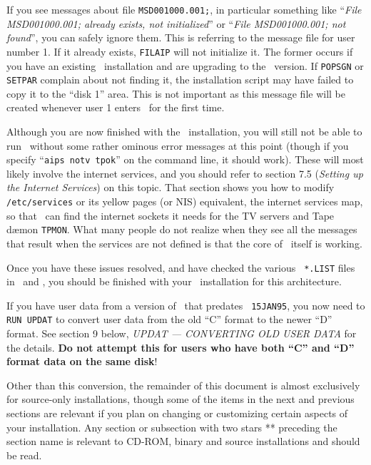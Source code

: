 \medskip{}

If you see messages about file {\tt MSD001000.001;}, in particular
something like ``{\it File MSD001000.001; already exists, not
initialized\/}'' or ``{\it File MSD001000.001; not found\/}'', you can
safely ignore them.  This is referring to the message file for user
number 1.  If it already exists, {\tt FILAIP} will not initialize it.
The former occurs if you have an existing \AIPS\ installation and are
upgrading to the \THISVER\ version.  If {\tt POPSGN} or {\tt SETPAR}
complain about not finding it, the installation script may have failed
to copy it to the ``disk 1'' area.  This is not important as this
message file will be created whenever user 1 enters \ttaips\ for the
first time.

Although you are now finished with the \AIPS\ installation, you will
still not be able to run \ttaips\ without some rather ominous error
messages at this point (though if you specify ``{\tt aips notv tpok}''
on the command line, it should work).  These will most likely involve
the internet services, and you should refer to section 7.5 ({\it Setting
up the Internet Services\/}) on this topic.  That section shows you how
to modify {\tt /etc/services} or its yellow pages (or NIS) equivalent,
the internet services map, so that \AIPS\ can find the internet sockets
it needs for the TV servers and Tape d\ae mon {\tt TPMON}.  What many
people do not realize when they see all the messages that result when
the services are not defined is that the core of \ttaips\ itself is
working.

Once you have these issues resolved, and have checked the various {\tt
*.LIST} files in \AROOT\ and , you should be finished with your
\AIPS\ installation for this architecture.

If you have user data from a version of \AIPS\ that predates {\tt
15JAN95}, you now need to {\tt RUN UPDAT} to convert user data from the
old ``C'' format to the newer ``D'' format.  See section 9 below, {\it
UPDAT --- CONVERTING OLD USER DATA\/} for the details.  {\bf Do not
attempt this for users who have both ``C'' and ``D'' format data on the
same disk}!

Other than this conversion, the remainder of this document is almost
exclusively for source-only installations, though some of the items in
the next and previous sections are relevant if you plan on changing or
customizing certain aspects of your installation.  Any section or
subsection with two stars ** preceding the section name is relevant to
CD-ROM, binary and source installations and should be read.

